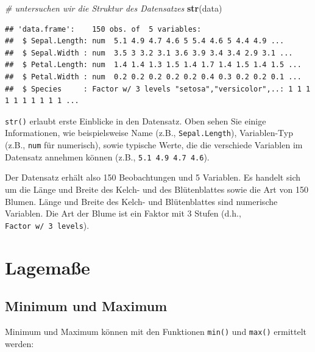\documentclass[
  ngerman,
]{book}
\newenvironment{Shaded}{\begin{snugshade}}{\end{snugshade}}
\newcommand{\CommentTok}[1]{\textcolor[rgb]{0.56,0.35,0.01}{\textit{#1}}}
\newcommand{\FunctionTok}[1]{\textcolor[rgb]{0.13,0.29,0.53}{\textbf{#1}}}
\newcommand{\NormalTok}[1]{#1}
\newcommand{\SpecialCharTok}[1]{\textcolor[rgb]{0.81,0.36,0.00}{\textbf{#1}}}
\begin{document}
\begin{Shaded}
\begin{Highlighting}[]
\CommentTok{\# untersuchen wir die Struktur des Datensatzes}
\FunctionTok{str}\NormalTok{(data)}
\end{Highlighting}
\end{Shaded}

\begin{verbatim}
## 'data.frame':    150 obs. of  5 variables:
##  $ Sepal.Length: num  5.1 4.9 4.7 4.6 5 5.4 4.6 5 4.4 4.9 ...
##  $ Sepal.Width : num  3.5 3 3.2 3.1 3.6 3.9 3.4 3.4 2.9 3.1 ...
##  $ Petal.Length: num  1.4 1.4 1.3 1.5 1.4 1.7 1.4 1.5 1.4 1.5 ...
##  $ Petal.Width : num  0.2 0.2 0.2 0.2 0.2 0.4 0.3 0.2 0.2 0.1 ...
##  $ Species     : Factor w/ 3 levels "setosa","versicolor",..: 1 1 1 1 1 1 1 1 1 1 ...
\end{verbatim}

\texttt{str()} erlaubt erste Einblicke in den Datensatz. Oben sehen Sie einige Informationen,
wie beispielsweise Name (z.B., \texttt{Sepal.Length}), Variablen-Typ (z.B., \texttt{num} für numerisch),
sowie typische Werte, die die verschiede Variablen im Datensatz annehmen können
(z.B., \texttt{5.1\ 4.9\ 4.7\ 4.6}).

Der Datensatz erhält also 150 Beobachtungen und 5 Variablen. Es handelt sich
um die Länge und Breite des Kelch- und des Blütenblattes sowie die Art von 150 Blumen.
Länge und Breite des Kelch- und Blütenblattes sind numerische Variablen.
Die Art der Blume ist ein Faktor mit 3 Stufen (d.h., \texttt{Factor\ w/\ 3\ levels}).

\section{Lagemaße}\label{lagemauxdfe}

\subsection{Minimum und Maximum}\label{minimum-und-maximum}

Minimum und Maximum können mit den Funktionen \texttt{min()} und \texttt{max()} ermittelt werden:

\begin{Shaded}
\end{Shaded}
\end{document}
